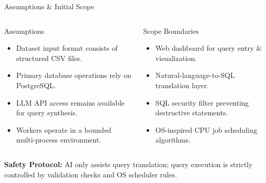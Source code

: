 \documentclass[aspectratio=169,11pt]{beamer}
\begin{document}
\begin{frame}{Assumptions \& Initial Scope}

\begin{columns}[T,totalwidth=\textwidth]

\begin{block}{Assumptions}
\scriptsize
\begin{itemize}\itemsep1pt
\item Dataset input format consists of structured CSV files.
\item Primary database operations rely on PostgreSQL.
\item LLM API access remains available for query synthesis.
\item Workers operate in a bounded multi-process environment.
\end{itemize}
\end{block}

\begin{block}{Scope Boundaries}
\scriptsize
\begin{itemize}\itemsep1pt
\item Web dashboard for query entry \& visualization.
\item Natural-language-to-SQL translation layer.
\item SQL security filter preventing destructive statements.
\item OS-inspired CPU job scheduling algorithms.
\end{itemize}
\end{block}

\end{columns}

\vspace{2mm}

\begin{center}
\colorbox{GEULightBlue}{
\parbox{.88\textwidth}{
\centering\scriptsize
\textbf{Safety Protocol:} AI only assists query translation; query execution is strictly controlled by validation checks and OS scheduler rules.
}}
\end{center}

\end{frame}


\end{document}
